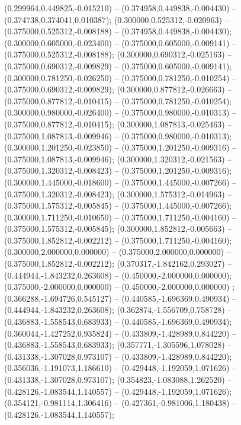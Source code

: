  (0.299964,0.449825,-0.015210) -- (0.374958,0.449838,-0.004430) -- (0.374738,0.374041,0.010387);
 (0.300000,0.525312,-0.020963) -- (0.375000,0.525312,-0.008188) -- (0.374958,0.449838,-0.004430);
 (0.300000,0.605000,-0.023400) -- (0.375000,0.605000,-0.009141) -- (0.375000,0.525312,-0.008188);
 (0.300000,0.690312,-0.025163) -- (0.375000,0.690312,-0.009829) -- (0.375000,0.605000,-0.009141);
 (0.300000,0.781250,-0.026250) -- (0.375000,0.781250,-0.010254) -- (0.375000,0.690312,-0.009829);
 (0.300000,0.877812,-0.026663) -- (0.375000,0.877812,-0.010415) -- (0.375000,0.781250,-0.010254);
 (0.300000,0.980000,-0.026400) -- (0.375000,0.980000,-0.010313) -- (0.375000,0.877812,-0.010415);
 (0.300000,1.087813,-0.025463) -- (0.375000,1.087813,-0.009946) -- (0.375000,0.980000,-0.010313);
 (0.300000,1.201250,-0.023850) -- (0.375000,1.201250,-0.009316) -- (0.375000,1.087813,-0.009946);
 (0.300000,1.320312,-0.021563) -- (0.375000,1.320312,-0.008423) -- (0.375000,1.201250,-0.009316);
 (0.300000,1.445000,-0.018600) -- (0.375000,1.445000,-0.007266) -- (0.375000,1.320312,-0.008423);
 (0.300000,1.575312,-0.014963) -- (0.375000,1.575312,-0.005845) -- (0.375000,1.445000,-0.007266);
 (0.300000,1.711250,-0.010650) -- (0.375000,1.711250,-0.004160) -- (0.375000,1.575312,-0.005845);
 (0.300000,1.852812,-0.005663) -- (0.375000,1.852812,-0.002212) -- (0.375000,1.711250,-0.004160);
 (0.300000,2.000000,0.000000) -- (0.375000,2.000000,0.000000) -- (0.375000,1.852812,-0.002212);
 (0.370317,-1.842162,0.293027) -- (0.444944,-1.843232,0.263608) -- (0.450000,-2.000000,0.000000);
 (0.375000,-2.000000,0.000000) -- (0.450000,-2.000000,0.000000) ;
 (0.366288,-1.694726,0.545127) -- (0.440585,-1.696369,0.490934) -- (0.444944,-1.843232,0.263608);
 (0.362874,-1.556709,0.758728) -- (0.436883,-1.558543,0.683933) -- (0.440585,-1.696369,0.490934);
 (0.360044,-1.427252,0.935824) -- (0.433809,-1.428989,0.844220) -- (0.436883,-1.558543,0.683933);
 (0.357771,-1.305596,1.078028) -- (0.431338,-1.307028,0.973107) -- (0.433809,-1.428989,0.844220);
 (0.356036,-1.191073,1.186610) -- (0.429448,-1.192059,1.071626) -- (0.431338,-1.307028,0.973107);
 (0.354823,-1.083088,1.262520) -- (0.428126,-1.083544,1.140557) -- (0.429448,-1.192059,1.071626);
 (0.354121,-0.981114,1.306416) -- (0.427361,-0.981006,1.180438) -- (0.428126,-1.083544,1.140557);
